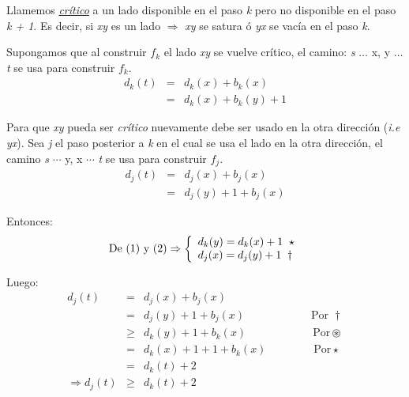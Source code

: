 \documentclass[12pt,a4paper]{report}
\begin{document}
			\par Llamemos \textit{\underline{crítico}} a un lado disponible en el paso \textit{k} pero no disponible en el paso \textit{k + 1}. Es decir, si \textit{xy} es un lado $\Rightarrow$ \textit{xy} se satura ó \textit{yx} se vacía en el paso \textit{k}.
			\par Supongamos que al construir $f_{k}$ el lado \textit{xy} se vuelve crítico, el camino: \textit{s} $\dotsc$ x, y $\dotsc$ \textit{t} se usa para construir $f_{k}$.
			\begin{eqnarray}
				d_{k}(\textit{t}) &=& d_{k}(x) + b_{k}(x) \\
				\nonumber &=& d_{k}(x) + b_{k}(y) + 1
			\end{eqnarray}

			\par Para que \textit{xy} pueda ser \textit{crítico} nuevamente debe ser usado en la otra dirección (\textit{i.e yx}). Sea \textit{j} el paso posterior a \textit{k} en el cual se usa el lado en la otra dirección, el camino \textit{s} $\dotsb$ y, x $\dotsb$ \textit{t} se usa para construir $f_{j}$.
			\begin{eqnarray}
				d_{j}(t) &=& d_{j}(x)+ b_{j}(x) \\
				\nonumber &=& d_{j}(y)+1+b_{j}(x)
			\end{eqnarray}

			\par Entonces:
			\begin{equation*}
				\textup{De (1) y (2)} \Rightarrow
	  		\left \lbrace
	  		\begin{array}{l}
					d_{k}(y) = d_{k}(x) + 1 \; \; \star \\
	    		d_{j}(x) = d_{j}(y) + 1 \; \; \dag
	  		\end{array}
	  		\right.
			\end{equation*}

			\par Luego:
			\begin{eqnarray}
				\nonumber d_{j}(t) &=& d_{j}(x) + b_{j}(x) \\
				\nonumber &=& d_{j}(y) + 1 + b_{j}(x) \qquad\qquad\qquad\text{Por } \dag \\
				\nonumber & \geq & d_{k}(y) + 1 + b_{k}(x) \qquad\qquad\qquad\text{Por} \circledast \\
				\nonumber &=& d_{k}(x) + 1 + 1 + b_{k}(x) \;\qquad\qquad\text{Por} \star \\
				\nonumber &=& d_{k}(\textit{t}) + 2 \\
				\nonumber \Rightarrow d_{j}(\textit{t}) & \geq & d_{k}(\textit{t}) + 2
			\end{eqnarray}
\end{document}

